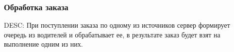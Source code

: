 \subsubsection{Обработка заказа} \label{selection_drivers_for_the_order}

    DESC:  При поступлении заказа по одному из источников сервер формирует очередь из водителей и обрабатывает ее, в результате заказ будет взят на выполнение одним из них. 

     
    
    

    

    